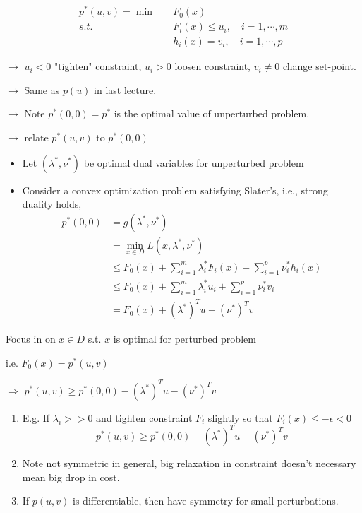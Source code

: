 \begin{align*}
	p^*(u,v) = \min \quad &F_0(x) \\
	s.t.\quad & F_i(x) \leq u_i ,\quad i = 1,\cdots,m\\
	& h_i(x) = v_i,\quad i = 1,\cdots, p
\end{align*}


$\rightarrow$ $u_i<0$ "tighten" constraint, $u_i>0$ loosen constraint, $v_i\neq 0$ change set-point.

$\rightarrow$ Same as $p(u)$ in last lecture.

$\rightarrow$ Note $p^*(0,0) = p^*$ is the optimal value of unperturbed problem.

$\rightarrow$ relate $p^*(u,v)$ to $p^*(0,0)$\\

\begin{itemize}
	\item Let $(\lambda^*, \nu^*)$ be optimal dual variables for unperturbed problem
	
	\item Consider a convex optimization problem satisfying Slater's, i.e., strong duality holds,
	\begin{align*}
		p^*(0,0) &= g(\lambda^*, \nu^*)\\
		&= \min_{x\in D} L(x, \lambda^*, \nu^*)\\
		&\leq F_0(x) + \sum^m_{i=1}\lambda_i^* F_i(x) + \sum^p_{i=1}\nu_i^* h_i(x)\\
		&\leq F_0(x) + \sum^m_{i=1}\lambda_i^* u_i + \sum^p_{i=1}\nu^*_iv_i\\
		&= F_0(x) + (\lambda^*)^Tu+(\nu^*)^Tv
	\end{align*}
\end{itemize}
Focus in on $x\in D$ s.t. $x$ is optimal for perturbed problem

i.e. $F_0(x)=p^*(u,v)$

$\Rightarrow$ $p^*(u,v) \geq p^*(0,0) - (\lambda^*)^Tu - (\nu^*)^Tv$

\begin{enumerate}
	\item E.g. If $\lambda_i >> 0$ and tighten constraint $F_i$ slightly so that $F_i(x)\leq -\epsilon < 0$\\
	
	\begin{equation*}
		p^*(u,v)\geq p^*(0,0) - (\lambda^*)^Tu - (\nu^*)^Tv
	\end{equation*}
	
	\item Note not symmetric in general, big relaxation in constraint doesn't necessary mean big drop in cost.
	
	\item If $p(u,v)$ is differentiable, then have symmetry for small perturbations. 
\end{enumerate}

